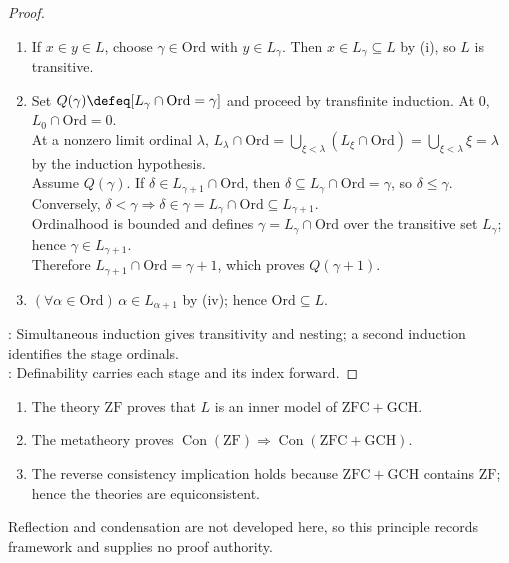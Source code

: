 \begin{proposition}
\begin{proof}
\begin{enumerate}[label=(\roman*)]
In the latter case, $L_\alpha\subseteq L_\gamma\subseteq L_{\gamma+1}$ by the induction hypothesis and the simultaneous induction in (i).\\
At a nonzero limit $\beta$, the case $\alpha=\beta$ is trivial.\\
If $\alpha<\beta$, then $\alpha+1<\beta$ and $L_\alpha\subseteq L_{\alpha+1}\subseteq L_\beta$ by the simultaneous induction in (i) and the definition of $L_\beta$.
\item If $x\in y\in L$, choose $\gamma\in\mathrm{Ord}$ with $y\in L_\gamma$. Then $x\in L_\gamma\subseteq L$ by (i), so $L$ is transitive.
\item Set $Q(\gamma)\defeq[L_\gamma\cap\mathrm{Ord}=\gamma]$ and proceed by transfinite induction. At $0$, $L_0\cap\mathrm{Ord}=0$.\\
At a nonzero limit ordinal $\lambda$, $L_\lambda\cap\mathrm{Ord}=\bigcup\limits_{\xi<\lambda}(L_\xi\cap\mathrm{Ord})=\bigcup\limits_{\xi<\lambda}\xi=\lambda$ by the induction hypothesis.\\
Assume $Q(\gamma)$. If $\delta\in L_{\gamma+1}\cap\mathrm{Ord}$, then $\delta\subseteq L_\gamma\cap\mathrm{Ord}=\gamma$, so $\delta\leq\gamma$. Conversely, $\delta<\gamma\Longrightarrow\delta\in\gamma=L_\gamma\cap\mathrm{Ord}\subseteq L_{\gamma+1}$.\\
Ordinalhood is bounded and defines $\gamma=L_\gamma\cap\mathrm{Ord}$ over the transitive set $L_\gamma$; hence $\gamma\in L_{\gamma+1}$.\\
Therefore $L_{\gamma+1}\cap\mathrm{Ord}=\gamma+1$, which proves $Q(\gamma+1)$.
\item $(\forall\alpha\in\mathrm{Ord})\,\alpha\in L_{\alpha+1}$ by (iv); hence $\mathrm{Ord}\subseteq L$.
\end{enumerate}
: Simultaneous induction gives transitivity and nesting; a second induction identifies the stage ordinals.\\
: Definability carries each stage and its index forward.
\end{proof}
\end{proposition}

\begin{principle} \label{princ:constructible-inner-model-relative-consistency} 
\begin{enumerate}[label=(\roman*)]
\setlength{\itemsep}{0pt}
\item The theory $\mathrm{ZF}$ proves that $L$ is an inner model of $\mathrm{ZFC}+\mathrm{GCH}$.
\item The metatheory proves $\operatorname{Con}(\mathrm{ZF})\Longrightarrow\operatorname{Con}(\mathrm{ZFC}+\mathrm{GCH})$.
\item The reverse consistency implication holds because $\mathrm{ZFC}+\mathrm{GCH}$ contains $\mathrm{ZF}$; hence the theories are equiconsistent.
\end{enumerate}
Reflection and condensation are not developed here, so this principle records framework and supplies no proof authority.
\end{principle}

